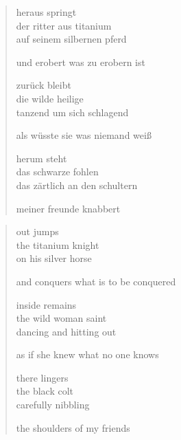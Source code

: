 
\cleartoverso


\begin{verse}

heraus springt\\
der ritter aus titanium\\
auf seinem silbernen pferd

und erobert was zu erobern ist

zurück bleibt\\
die wilde heilige\\
tanzend um sich schlagend

als wüsste sie was niemand weiß

herum steht\\
das schwarze fohlen\\
das zärtlich an den schultern

meiner freunde knabbert

\end{verse}

\clearpage


\begin{verse}

out jumps\\
the titanium knight\\
on his silver horse

and conquers what is to be conquered

inside remains\\
the wild woman saint\\
dancing and hitting out

as if she knew what no one knows

there lingers\\
the black colt\\
carefully nibbling

the shoulders of my friends

\end{verse}
